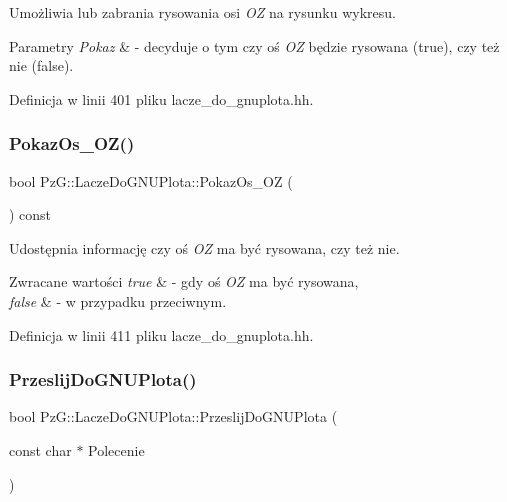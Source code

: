 Umożliwia lub zabrania rysowania osi {\itshape OZ} na rysunku wykresu. 
\begin{DoxyParams}{Parametry}
{\em Pokaz} & -\/ decyduje o tym czy oś {\itshape OZ} będzie rysowana ({\ttfamily true}), czy też nie ({\ttfamily false}). \\
\hline
\end{DoxyParams}


Definicja w linii 401 pliku lacze\+\_\+do\+\_\+gnuplota.\+hh.

\mbox{\label{class_pz_g_1_1_lacze_do_g_n_u_plota_a22c708af33c57bf3b5d1b4e82b4017b7}} 
\subsubsection{\texorpdfstring{PokazOs\_OZ()}{PokazOs\_OZ()}\hspace{0.1cm}{\footnotesize\ttfamily [2/2]}}
{\footnotesize\ttfamily bool Pz\+G\+::\+Lacze\+Do\+G\+N\+U\+Plota\+::\+Pokaz\+Os\+\_\+\+OZ (\begin{DoxyParamCaption}{ }\end{DoxyParamCaption}) const\hspace{0.3cm}{\ttfamily [inline]}}

Udostępnia informację czy oś {\itshape OZ} ma być rysowana, czy też nie. 
\begin{DoxyRetVals}{Zwracane wartości}
{\em true} & -\/ gdy oś {\itshape OZ} ma być rysowana, \\
\hline
{\em false} & -\/ w przypadku przeciwnym. \\
\hline
\end{DoxyRetVals}


Definicja w linii 411 pliku lacze\+\_\+do\+\_\+gnuplota.\+hh.

\mbox{\label{class_pz_g_1_1_lacze_do_g_n_u_plota_a5063854b7232a7951d120a21df63f2b7}} 
\subsubsection{\texorpdfstring{PrzeslijDoGNUPlota()}{PrzeslijDoGNUPlota()}}
{\footnotesize\ttfamily bool Pz\+G\+::\+Lacze\+Do\+G\+N\+U\+Plota\+::\+Przeslij\+Do\+G\+N\+U\+Plota (\begin{DoxyParamCaption}\item[{const char $\ast$}]{Polecenie }\end{DoxyParamCaption})\hspace{0.3cm}{\ttfamily [protected]}}

